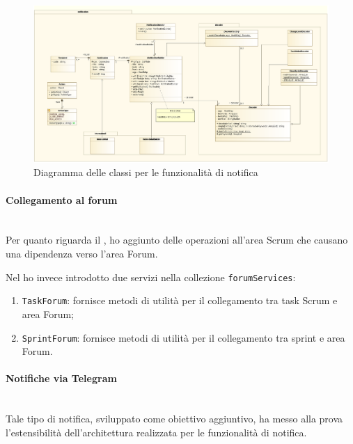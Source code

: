 \begin{landscape}
\begin{figure}%
\centering
\includegraphics[width=\columnwidth]{immagini/notif-class_diagram}
\caption{Diagramma delle classi per le funzionalità di notifica}
\label{fig:arch-notif}%
\end{figure}
\end{landscape}

\paragraph{Collegamento al forum} \mbox{} \\

Per quanto riguarda il \BKEND{}, ho aggiunto delle operazioni all'area Scrum
che causano una dipendenza verso l'area Forum.

Nel \FREND{} ho invece introdotto due servizi nella collezione
\texttt{forumServices}:

\begin{enumerate}
\item \texttt{TaskForum}: fornisce metodi di utilità per il collegamento tra
  task Scrum e area Forum;
\item \texttt{SprintForum}: fornisce metodi di utilità per il collegamento tra
  sprint e area Forum.
\end{enumerate}

\paragraph{Notifiche via Telegram} \mbox{} \\

Tale tipo di notifica, sviluppato come obiettivo aggiuntivo, ha messo alla
prova l'estensibilità dell'architettura realizzata per le funzionalità di
notifica.

